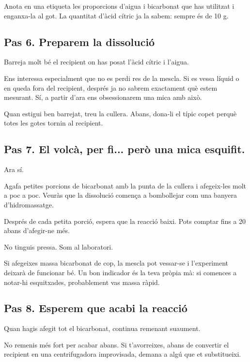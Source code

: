 Anota en una etiqueta les proporcions d’aigua i bicarbonat que has utilitzat i enganxa-la al got. La quantitat d’àcid cítric ja la sabem: sempre és de 10 g.

\subsection{Pas 6. Preparem la dissolució}

Barreja molt bé el recipient on has posat l'àcid cítric i l'aigua.

Ens interessa especialment que no es perdi res de la mescla. Si es vessa líquid o en queda fora del recipient, després ja no sabrem exactament què estem mesurant.
Sí, a partir d’ara ens obsessionarem una mica amb això.

Quan estigui ben barrejat, treu la cullera. Abans, dona-li el típic copet perquè totes les gotes tornin al recipient.



\vfill
\newpage

\subsection{Pas 7. El volcà, per fi... però una mica esquifit.}

Ara sí.

Agafa petites porcions de bicarbonat amb la punta de la cullera i afegeix-les molt a poc a poc. Veuràs que la dissolució comença a bombollejar com una banyera d’hidromassatge.

Després de cada petita porció, espera que la reacció baixi. Pots comptar fins a 20 abans d'afegir-ne més.

No tinguis pressa. Som al laboratori.

Si afegeixes massa bicarbonat de cop, la mescla pot vessar-se i l'experiment deixarà de funcionar bé. Un bon indicador és la teva pròpia mà: si comences a notar-hi esquitxades, probablement vas massa ràpid.

\subsection{Pas 8. Esperem que acabi la reacció}

Quan hagis afegit tot el bicarbonat, continua remenant suaument.

No remenis més fort per acabar abans. Si t'avorreixes, abans de convertir el recipient en una centrifugadora improvisada, demana a algú que et substitueixi.

